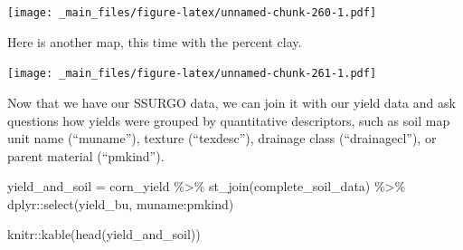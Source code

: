 \documentclass[
]{book}
\newenvironment{Shaded}{\begin{snugshade}}{\end{snugshade}}
\newcommand{\AttributeTok}[1]{\textcolor[rgb]{0.77,0.63,0.00}{#1}}
\newcommand{\CommentTok}[1]{\textcolor[rgb]{0.56,0.35,0.01}{\textit{#1}}}
\newcommand{\DecValTok}[1]{\textcolor[rgb]{0.00,0.00,0.81}{#1}}
\newcommand{\FloatTok}[1]{\textcolor[rgb]{0.00,0.00,0.81}{#1}}
\newcommand{\FunctionTok}[1]{\textcolor[rgb]{0.00,0.00,0.00}{#1}}
\newcommand{\NormalTok}[1]{#1}
\newcommand{\OtherTok}[1]{\textcolor[rgb]{0.56,0.35,0.01}{#1}}
\newcommand{\SpecialCharTok}[1]{\textcolor[rgb]{0.00,0.00,0.00}{#1}}
\newcommand{\StringTok}[1]{\textcolor[rgb]{0.31,0.60,0.02}{#1}}
\begin{document}
\texttt{[image: \_main\_files/figure-latex/unnamed-chunk-260-1.pdf]}

Here is another map, this time with the percent clay.

\begin{Shaded}
\end{Shaded}

\texttt{[image: \_main\_files/figure-latex/unnamed-chunk-261-1.pdf]}

Now that we have our SSURGO data, we can join it with our yield data and ask questions how yields were grouped by quantitative descriptors, such as soil map unit name (``muname''), texture (``texdesc''), drainage class (``drainagecl''), or parent material (``pmkind'').

\begin{Shaded}
\begin{Highlighting}[]
\NormalTok{yield\_and\_soil }\OtherTok{=}\NormalTok{ corn\_yield }\SpecialCharTok{\%\textgreater{}\%}
  \FunctionTok{st\_join}\NormalTok{(complete\_soil\_data) }\SpecialCharTok{\%\textgreater{}\%}
\NormalTok{  dplyr}\SpecialCharTok{::}\FunctionTok{select}\NormalTok{(yield\_bu, muname}\SpecialCharTok{:}\NormalTok{pmkind)}

\NormalTok{knitr}\SpecialCharTok{::}\FunctionTok{kable}\NormalTok{(}\FunctionTok{head}\NormalTok{(yield\_and\_soil))}
\end{Highlighting}
\end{Shaded}
\end{document}
